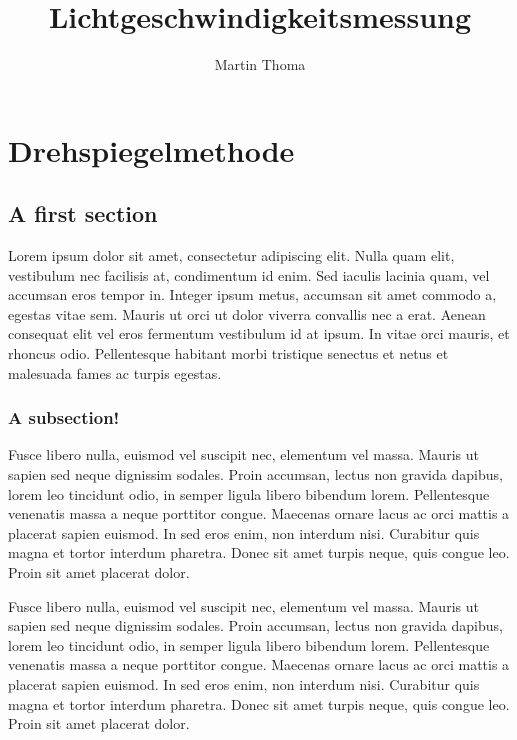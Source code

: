 \documentclass[11pt,a4paper,oneside]{report}
\newcommand\yourName{Martin Thoma}
\newcommand\yourTitle{Lichtgeschwindigkeitsmessung}
\begin{document}
 \author{\yourName}
 \title{\yourTitle}

 \maketitle
 \tableofcontents

\chapter{Drehspiegelmethode}
\section{A first section}
Lorem ipsum dolor sit amet, consectetur adipiscing elit. Nulla quam
elit, vestibulum nec facilisis at, condimentum id enim. Sed iaculis
lacinia quam, vel accumsan eros tempor in. Integer ipsum metus,
accumsan sit amet commodo a, egestas vitae sem. Mauris ut orci ut
dolor viverra convallis nec a erat. Aenean consequat elit vel eros
fermentum vestibulum id at ipsum. In vitae orci mauris, et rhoncus
odio. Pellentesque habitant morbi tristique senectus et netus et
malesuada fames ac turpis egestas.

\subsection{A subsection!}
Fusce libero nulla, euismod vel suscipit nec, elementum vel massa.
Mauris ut sapien sed neque dignissim sodales. Proin accumsan, lectus
non gravida dapibus, lorem leo tincidunt odio, in semper ligula
libero bibendum lorem. Pellentesque venenatis massa a neque porttitor
congue. Maecenas ornare lacus ac orci mattis a placerat sapien
euismod. In sed eros enim, non interdum nisi. Curabitur quis magna
et tortor interdum pharetra. Donec sit amet turpis neque, quis congue
leo. Proin sit amet placerat dolor.

Fusce libero nulla, euismod vel suscipit nec, elementum vel massa.
Mauris ut sapien sed neque dignissim sodales. Proin accumsan, lectus
non gravida dapibus, lorem leo tincidunt odio, in semper ligula
libero bibendum lorem. Pellentesque venenatis massa a neque porttitor
congue. Maecenas ornare lacus ac orci mattis a placerat sapien
euismod. In sed eros enim, non interdum nisi. Curabitur quis magna
et tortor interdum pharetra. Donec sit amet turpis neque, quis congue
leo. Proin sit amet placerat dolor.
\end{document}
